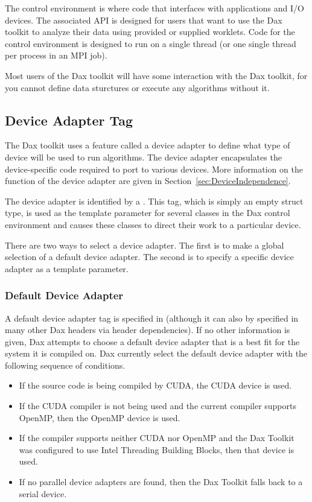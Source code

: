 The control environment is where code that interfaces with applications and
I/O devices. The associated API is designed for users that want to use the
Dax toolkit to analyze their data using provided or supplied worklets. Code
for the control environment is designed to run on a single thread (or one
single thread per process in an MPI job).

Most users of the Dax toolkit will have some interaction with the Dax
toolkit, for you cannot define data sturctures or execute any algorithms
without it.

\subsection{Device Adapter Tag}
\label{sec:DeviceAdapterTag}


The Dax toolkit uses a feature called a device adapter to define what type
of device will be used to run algorithms. The device adapter encapsulates
the device-specific code required to port to various devices. More
information on the function of the device adapter are given in
Section~\ref{sec:DeviceIndependence}.

The device adapter is identified by a .
 This tag, which is simply an empty struct type,
is used as the template parameter for several classes in the Dax control
environment and causes these classes to direct their work to a particular
device.

There are two ways to select a device adapter. The first is to make a
global selection of a default device adapter. The second is to specify a
specific device adapter as a template parameter.

\subsubsection{Default Device Adapter}

A default device adapter tag is specified in
 (although it can also by specified in
many other Dax headers via header dependencies). If no other information is
given, Dax attempts to choose a default device adapter that is a best fit
for the system it is compiled on. Dax currently select the default device
adapter with the following sequence of conditions.

\begin{itemize}
\item {} If the source code is being compiled by CUDA, the CUDA
  device is used.
\item {} If the CUDA compiler is not being used and the current
  compiler supports OpenMP, then the OpenMP device is used.
\item {}  If the compiler
  supports neither CUDA nor OpenMP and the Dax Toolkit was configured to
  use Intel Threading Building Blocks, then that device is used.
\item {} If no parallel device adapters are found, then the Dax
  Toolkit falls back to a serial device.
\end{itemize}

